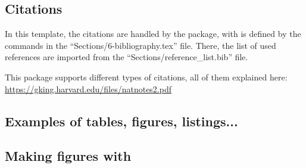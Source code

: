     \subsection{Citations}
      In this template, the citations are handled by the  package, with is defined by the commands in the ``Sections/6-bibliography.tex'' file. There, the list of used references are imported from the ``Sections/reference\_list.bib'' file.

      This package supports different types of citations, all of them explained here: \url{https://gking.harvard.edu/files/natnotes2.pdf}

    \subsection{Examples of tables, figures, listings...}

    \subsection{Making figures with }